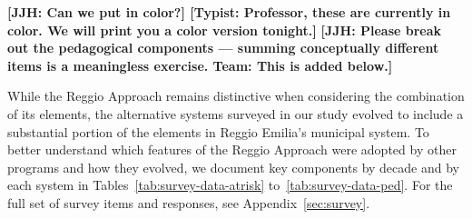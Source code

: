 \textbf{[JJH: Can we put in color?] [Typist: Professor, these are currently in color. We will print you a color version tonight.]}
\textbf{[JJH: Please break out the pedagogical components --- summing conceptually different items is a meaningless exercise. Team: This is added below.]}

While the Reggio Approach remains distinctive when considering the combination of its elements, the alternative systems surveyed in our study evolved to include a substantial portion of the elements in Reggio Emilia's municipal system. To better understand which features of the Reggio Approach were adopted by other programs and how they evolved, we document key components by decade and by each system in Tables~\ref{tab:survey-data-atrisk} to~\ref{tab:survey-data-ped}. For the full set of survey items and responses, see Appendix~\ref{sec:survey}.

